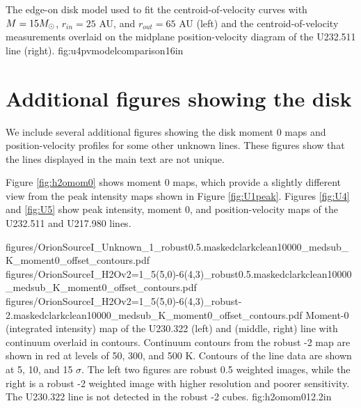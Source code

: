 \documentclass[twocolumn]{aastex62}
\begin{document}
{The edge-on disk model used to fit the centroid-of-velocity curves with
$M=15 M_{\odot}$, $r_{in}=25$ AU, and $r_{out}=65$ AU (left) and the centroid-of-velocity measurements
overlaid on the midplane position-velocity diagram of the U232.511 line (right).}
{fig:u4pvmodelcomparison}{1}{6in}

\section{Additional figures showing the disk}
\label{sec:ulinefigures}
We include several additional figures showing the disk moment 0 maps and
position-velocity profiles for some other unknown lines.  These figures show
that the lines displayed in the main text are not unique.

Figure \ref{fig:h2omom0} shows moment 0 maps, which provide a slightly
different view from the peak intensity maps shown in Figure \ref{fig:U1peak}.
Figures \ref{fig:U4} and \ref{fig:U5} show peak intensity, moment 0, and
position-velocity maps of the U232.511 and U217.980 lines.

\FigureThree
{{figures/OrionSourceI_Unknown_1_robust0.5.maskedclarkclean10000_medsub_K_moment0_offset_contours}.pdf}
{{figures/OrionSourceI_H2Ov2=1_5(5,0)-6(4,3)_robust0.5.maskedclarkclean10000_medsub_K_moment0_offset_contours}.pdf}
{{figures/OrionSourceI_H2Ov2=1_5(5,0)-6(4,3)_robust-2.maskedclarkclean10000_medsub_K_moment0_offset_contours}.pdf}
{Moment-0 (integrated intensity) map of the U230.322 (left) and \water (middle,
right) line with continuum overlaid in contours.  Continuum contours
from the robust -2 map are shown
in red at levels of 
50,  300, and 500 K.
Contours of the line data are shown at 5, 10, and 15 $\sigma$.
The left two figures are robust 0.5 weighted images, while the right
is a robust -2 weighted image with higher resolution and poorer
sensitivity.  The U230.322 line is not detected in the robust -2 cubes.
}
{fig:h2omom0}{1}{2.2in}
\end{document}
